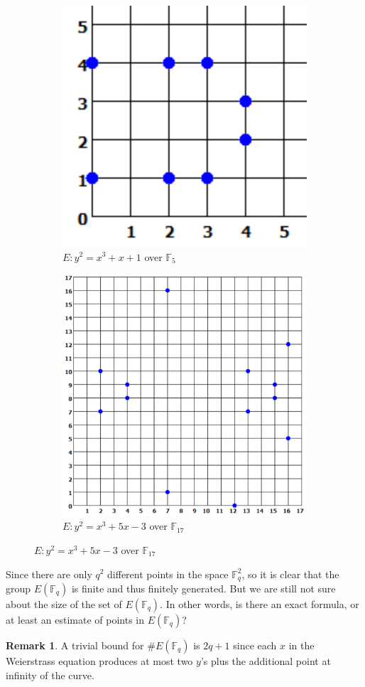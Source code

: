 \documentclass[12pt]{article}
\theoremstyle{remark}
\theoremstyle{definition}
\newtheorem{remark}{Remark}[subsection]
\newcommand{\F}[0]{\mathbb{F}}
\begin{document}
    \begin{figure}[h]
        \centering
        \begin{subfigure}{.5\textwidth}
        \centering
        \includegraphics[width=.7\linewidth]{figures/3.png}
        \caption{$E:y^2=x^3+x+1$ over $\F_5$}
        \label{figure-vis1}
        \end{subfigure}%
        \begin{subfigure}{.5\textwidth}
        \centering
        \includegraphics[width=.7\linewidth]{figures/4.png}
        
        \caption{$E:y^2=x^3+5x-3$ over $\F_{17}$}
        \label{figure-vis2}
        \end{subfigure}
    \end{figure}
    
    Since there are only $q^2$ different points in the space $\F_q^2$, so it is clear that the group $E(\F_q)$ is finite and thus finitely generated. But we are still not sure about the size of the set of $E(\F_q).$ In other words, is there an exact formula, or at least an estimate of points in $E(\F_q)$?
    \begin{remark}
        A trivial bound for $\#E(\F_q)$ is $2q+1$ since each $x$ in the Weierstrass equation produces at most two $y$'s plus the additional point at infinity of the curve.
    \end{remark}
   
\end{document}
